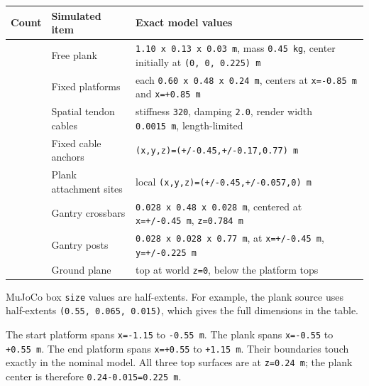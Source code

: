 \documentclass[
  american,
  11pt,
  letterpaper,
]{article}
\newcounter{none} %
\begin{document}
{\def\LTcaptype{none} %
\begin{longtable}[]{@{}
  >{\raggedleft\arraybackslash}p{}
  >{\raggedright\arraybackslash}p{}
  >{\raggedright\arraybackslash}p{}@{}}
\toprule\noalign{}
\begin{minipage}[b]{\linewidth}\raggedleft
Count
\end{minipage} & \begin{minipage}[b]{\linewidth}\raggedright
Simulated item
\end{minipage} & \begin{minipage}[b]{\linewidth}\raggedright
Exact model values
\end{minipage} \\
\midrule\noalign{}
\endhead
\bottomrule\noalign{}
\endlastfoot
1 & Free plank & \texttt{1.10\ x\ 0.13\ x\ 0.03\ m}, mass
\texttt{0.45\ kg}, center initially at \texttt{(0,\ 0,\ 0.225)\ m} \\
2 & Fixed platforms & each \texttt{0.60\ x\ 0.48\ x\ 0.24\ m}, centers
at \texttt{x=-0.85\ m} and \texttt{x=+0.85\ m} \\
4 & Spatial tendon cables & stiffness \texttt{320}, damping
\texttt{2.0}, render width \texttt{0.0015\ m}, length-limited \\
4 & Fixed cable anchors & \texttt{(x,y,z)=(+/-0.45,+/-0.17,0.77)\ m} \\
4 & Plank attachment sites & local
\texttt{(x,y,z)=(+/-0.45,+/-0.057,0)\ m} \\
2 & Gantry crossbars & \texttt{0.028\ x\ 0.48\ x\ 0.028\ m}, centered at
\texttt{x=+/-0.45\ m}, \texttt{z=0.784\ m} \\
4 & Gantry posts & \texttt{0.028\ x\ 0.028\ x\ 0.77\ m}, at
\texttt{x=+/-0.45\ m}, \texttt{y=+/-0.225\ m} \\
1 & Ground plane & top at world \texttt{z=0}, below the platform tops \\
\end{longtable}
}

MuJoCo box \texttt{size} values are half-extents. For example, the plank
source uses half-extents \texttt{(0.55,\ 0.065,\ 0.015)}, which gives
the full dimensions in the table.

The start platform spans \texttt{x=-1.15} to \texttt{-0.55\ m}. The
plank spans \texttt{x=-0.55} to \texttt{+0.55\ m}. The end platform
spans \texttt{x=+0.55} to \texttt{+1.15\ m}. Their boundaries touch
exactly in the nominal model. All three top surfaces are at
\texttt{z=0.24\ m}; the plank center is therefore
\texttt{0.24-0.015=0.225\ m}.
\end{document}
